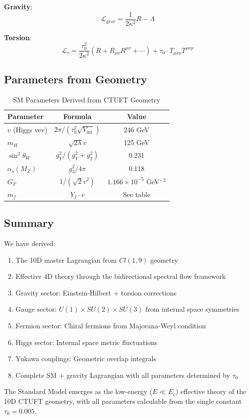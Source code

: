 \textbf{Gravity}:
\begin{equation}
    \mathcal{L}_{\text{grav}} = \frac{1}{2\kappa^2}R - \Lambda
\end{equation}

\textbf{Torsion}:
\begin{equation}
    \mathcal{L}_{\tau} = \frac{\tau_0^2}{2\kappa^2}\left(R + R_{\mu\nu}R^{\mu\nu} + \cdots\right) + \tau_0 \cdot T_{\mu\nu\rho}T^{\mu\nu\rho}
\end{equation}

\subsection{Parameters from Geometry}

\begin{table}[htbp]
\centering
\caption{SM Parameters Derived from CTUFT Geometry}
\begin{tabular}{@{}lcc@{}}
\hline
\textbf{Parameter} & \textbf{Formula} & \textbf{Value} \\
\hline
$v$ (Higgs vev) & $2\pi/(\tau_0^2\sqrt{V_{\text{int}}})$ & 246 GeV \\
$m_H$ & $\sqrt{2\lambda}v$ & 125 GeV \\
$\sin^2\theta_W$ & $g_Y^2/(g_Y^2+g_2^2)$ & 0.231 \\
$\alpha_s(M_Z)$ & $g_3^2/4\pi$ & 0.118 \\
$G_F$ & $1/(\sqrt{2}v^2)$ & $1.166 \times 10^{-5}$ GeV$^{-2}$ \\
$m_f$ & $Y_f \cdot v$ & See table \\
\hline
\end{tabular}
\end{table}

\subsection{Summary}

We have derived:
\begin{enumerate}
    \item The 10D master Lagrangian from $Cl(1,9)$ geometry
    \item Effective 4D theory through the bidirectional spectral flow framework
    \item Gravity sector: Einstein-Hilbert + torsion corrections
    \item Gauge sector: $U(1) \times SU(2) \times SU(3)$ from internal space symmetries
    \item Fermion sector: Chiral fermions from Majorana-Weyl condition
    \item Higgs sector: Internal space metric fluctuations
    \item Yukawa couplings: Geometric overlap integrals
    \item Complete SM + gravity Lagrangian with all parameters determined by $\tau_0$
\end{enumerate}

The Standard Model emerges as the low-energy ($E \ll E_c$) effective theory of the 10D CTUFT geometry, with all parameters calculable from the single constant $\tau_0 = 0.005$.
